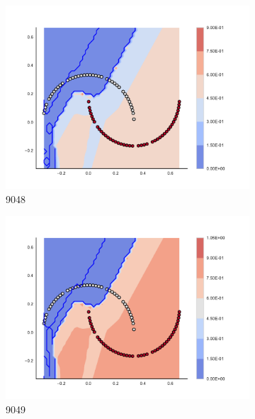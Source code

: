 \begin{figure}[h]
\begin{subfigure}[b]{0.09\textwidth}
    \includegraphics[clip, trim=2.35cm 1.75cm 4.5cm 0cm,width=\textwidth]{img/convergence/9048.pdf}
    \caption{9048}
    \label{fig:convergence_9048}
\end{subfigure}
%
\begin{subfigure}[b]{0.09\textwidth}
    \includegraphics[clip, trim=2.35cm 1.75cm 4.5cm 0cm,width=\textwidth]{img/convergence/9049.pdf}
    \caption{9049}
    \label{fig:convergence_9049}
\end{subfigure}
%
\begin{subfigure}[b]{0.09\textwidth}

\end{subfigure}
\end{figure}
